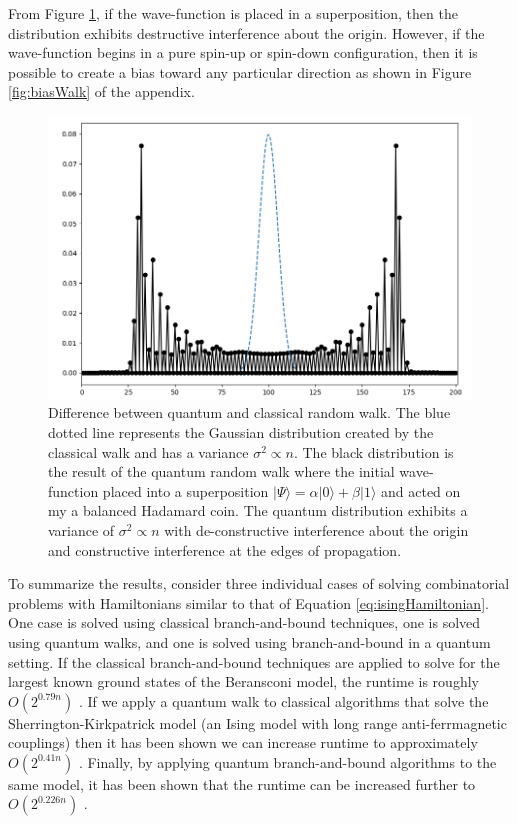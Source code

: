 From Figure \ref{fig:quantumWalk}, if the wave-function is placed in a superposition, then the distribution exhibits destructive interference about the origin.
However, if the wave-function begins in a pure spin-up or spin-down configuration, then it is possible to create a bias toward any particular direction as shown in Figure \ref{fig:biasWalk} of the appendix.
\begin{figure}[H]
	\begin{center}
		\includegraphics[width=12cm]{images/afunc2}
	\end{center}
	\caption{\doublespacing Difference between quantum and classical random walk. The blue dotted line represents the Gaussian distribution created by the classical walk and has a variance $\sigma^2 \propto n$. The black distribution is the result of the quantum random walk where the initial wave-function placed into a superposition $|\Psi\rangle = \alpha|0\rangle + \beta|1\rangle$ and acted on my a balanced Hadamard coin. The quantum distribution exhibits a variance of $\sigma^2 \propto n$ with de-constructive interference about the origin and constructive interference at the edges of propagation.}
	\label{fig:quantumWalk}
\end{figure}
\noindent
To summarize the results, consider three individual cases of solving combinatorial problems with Hamiltonians similar to that of Equation \ref{eq:isingHamiltonian}.
One case is solved using classical branch-and-bound techniques, one is solved using quantum walks, and one is solved using branch-and-bound in a quantum setting. 
If the classical branch-and-bound techniques are applied to solve for the largest known ground states of the Beransconi model, the runtime is roughly $O(2^{0.79n})$ \cite{packebusch2016low}. 
If we apply a quantum walk to classical algorithms that solve the Sherrington-Kirkpatrick model (an Ising model with long range anti-ferrmagnetic couplings) then it has been shown we can increase runtime to approximately $O(2^{0.41n})$ \cite{callison2019finding}. 
Finally, by applying quantum branch-and-bound algorithms to the same model, it has been shown that the runtime can be increased further to $O(2^{0.226n})$ \cite{montanaro2020quantum}.